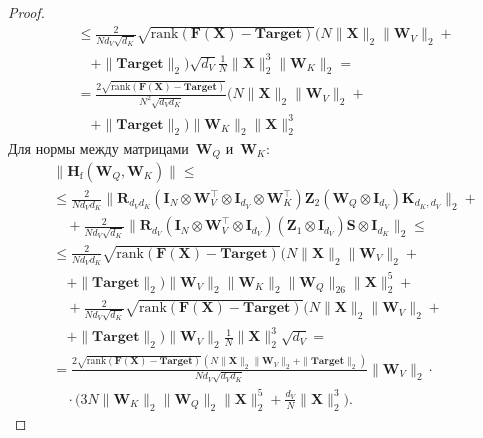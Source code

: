 \begin{proof}
\begin{align}
    &\leq \frac{2}{N d_V\sqrt{d_K}} \sqrt{\mathrm{rank}(\mathbf{F}(\mathbf{X}) - \textbf{Target})} \Big(N \|\mathbf{X}\|_2 \|\mathbf{W}_V \|_2 +\\
    &\quad +\|\textbf{Target}\|_2\Big) \sqrt{d_V} \frac{1}{N} \|\mathbf{X}\|^3_2\|\mathbf{W}_K\|_2 = \\
    &= \frac{2\sqrt{\mathrm{rank}(\mathbf{F}(\mathbf{X}) - \textbf{Target})}}{N^2\sqrt{d_Vd_K}}\Big(N \|\mathbf{X}\|_2 \|\mathbf{W}_V \|_2 + \\
    &\quad+\|\textbf{Target}\|_2\Big)\|\mathbf{W}_K\|_2 \|\mathbf{X}\|^3_2
\end{align}
Для нормы между матрицами~$\mathbf{W}_Q$ и~$\mathbf{W}_K$:
\begin{align}
    &\|\mathbf{H}_\mathrm{f}(\mathbf{W}_Q, \mathbf{W}_K)\| \leq \\
    &\leq\frac{2}{N d_V d_K}\| \mathbf{R}_{d_V d_K} \left(\mathbf{I}_{N} \otimes \mathbf{W}_V^\top \otimes \mathbf{I}_{d_V} \otimes \mathbf{W}_K^\top\right) \mathbf{Z}_2 \left(\mathbf{W}_Q \otimes \mathbf{I}_{d_V}\right) \mathbf{K}_{d_K, d_V}\|_2 + \\
    &\quad + \frac{2}{N d_V\sqrt{d_K}} \|\mathbf{R}_{d_V} \left(\mathbf{I}_{N} \otimes \mathbf{W}_V^\top \otimes \mathbf{I}_{d_V}\right) \left(\mathbf{Z}_1 \otimes \mathbf{I}_{d_V}\right) \mathbf{S} \otimes \mathbf{I}_{d_K}\|_2 \leq\\
    &\leq  \frac{2}{N d_V d_K}\sqrt{\mathrm{rank}(\mathbf{F}(\mathbf{X}) - \textbf{Target})} \Big(N \|\mathbf{X}\|_2 \|\mathbf{W}_V \|_2 +\\
    &\quad + \|\textbf{Target}\|_2\Big) \|\mathbf{W}_V\|_2 \|\mathbf{W}_K\|_2 \|\mathbf{W}_Q\|_26 \| \mathbf{X}\|^5_2 + \\
    &\quad+\frac{2}{N d_V\sqrt{d_K}}\sqrt{\mathrm{rank}(\mathbf{F}(\mathbf{X}) - \textbf{Target})} \Big(N \|\mathbf{X}\|_2 \|\mathbf{W}_V \|_2 + \\
    &\quad +\|\textbf{Target}\|_2\Big) \|\mathbf{W}_V \|_2 \frac{1}{N} \|\mathbf{X}\|^3_2 \sqrt{d_V} =\\
    &=\frac{2\sqrt{\mathrm{rank}(\mathbf{F}(\mathbf{X}) - \textbf{Target})} (N \|\mathbf{X}\|_2 \|\mathbf{W}_V \|_2 + \|\textbf{Target}\|_2)}{N d_V\sqrt{d_Vd_K}} \|\mathbf{W}_V\|_2 \cdot \\
    & \quad \cdot \Big(3N\|\mathbf{W}_K\|_2 \|\mathbf{W}_Q\|_2 \| \mathbf{X}\|^5_2 + \frac{d_V}{N} \|\mathbf{X}\|^3_2\Big).
\end{align}


\end{proof}
